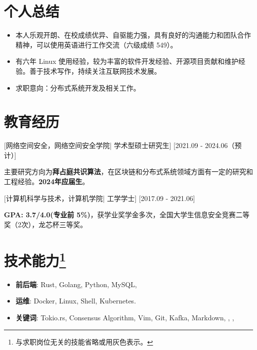 \documentclass{resume}
\begin{document}

\ResumeTitle

\section{个人总结}

\begin{itemize}
  \item 本人乐观开朗、在校成绩优异、自驱能力强，具有良好的沟通能力和团队合作精神，可以使用英语进行工作交流（六级成绩 549）。
  \item 有六年 Linux 使用经验，较为丰富的软件开发经验、开源项目贡献和维护经验。善于技术写作，持续关注互联网技术发展。
  \item 求职意向：分布式系统开发及相关工作。
\end{itemize}

\section{教育经历}
[\textnormal{网络空间安全，网络空间安全学院|}  学术型硕士研究生]
[2021.09 - 2024.06（预计）]

主要研究方向为\textbf{拜占庭共识算法}，在区块链和分布式系统领域方面有一定的研究和工程经验。\textbf{2024年应届生}。

[\textnormal{计算机科学与技术，计算机学院|} 工学学士]
[2017.09 - 2021.06]

\textbf{GPA: 3.7/4.0(专业前 5\%)}，获学业奖学金多次，全国大学生信息安全竞赛二等奖（2次），龙芯杯三等奖。


\section[技术能力]{技术能力\protect\footnote{与求职岗位无关的技能省略或用灰色表示。}}
\begin{itemize}
  \item \textbf{前后端}: Rust, Golang, Python, MySQL, 
  \item \textbf{运维}: Docker, Linux, Shell, Kubernetes.
  \item \textbf{关键词}: Tokio.rs, Consensus Algorithm, Vim, Git, Kafka, Markdown, , \GrayText{\LaTeX}, 
\end{itemize}
\end{document}
